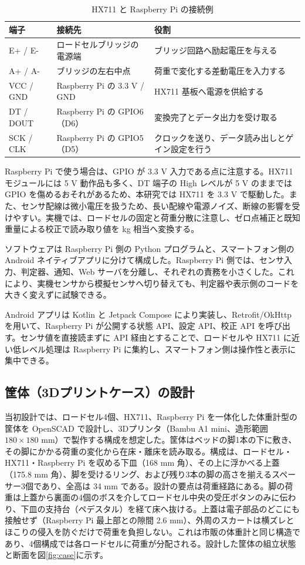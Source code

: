 \documentclass[paper=a4,fontsize=10pt,ja=standard,lualatex]{jlreq}
\begin{document}
\begin{table}[h]
\centering
\caption{HX711 と Raspberry Pi の接続例}
\label{tab:hx711}
\begin{tabularx}{0.95\linewidth}{lYY}
\toprule
端子 & 接続先 & 役割\\
\midrule
E+ / E- & ロードセルブリッジの電源端 & ブリッジ回路へ励起電圧を与える\\
A+ / A- & ブリッジの左右中点 & 荷重で変化する差動電圧を入力する\\
VCC / GND & Raspberry Pi の 3.3 V / GND & HX711 基板へ電源を供給する\\
DT / DOUT & Raspberry Pi の GPIO6（D6） & 変換完了とデータ出力を受け取る\\
SCK / CLK & Raspberry Pi の GPIO5（D5） & クロックを送り、データ読み出しとゲイン設定を行う\\
\bottomrule
\end{tabularx}
\end{table}

Raspberry Pi で使う場合は、GPIO が 3.3 V 入力である点に注意する。HX711 モジュールには 5 V 動作品も多く、DT 端子の High レベルが 5 V のままでは GPIO を傷めるおそれがあるため、本研究では HX711 を 3.3 V で駆動した。また、センサ配線は微小電圧を扱うため、長い配線や電源ノイズ、断線の影響を受けやすい。実機では、ロードセルの固定と荷重分散に注意し、ゼロ点補正と既知重量による校正で読み取り値を kg 相当へ変換する。

ソフトウェアは Raspberry Pi 側の Python プログラムと、スマートフォン側の Android ネイティブアプリに分けて構成した。Raspberry Pi 側では、センサ入力、判定器、通知、Web サーバを分離し、それぞれの責務を小さくした。これにより、実機センサから模擬センサへ切り替えても、判定器や表示側のコードを大きく変えずに試験できる。

Android アプリは Kotlin と Jetpack Compose により実装し、Retrofit/OkHttp を用いて、Raspberry Pi が公開する状態 API、設定 API、校正 API を呼び出す。センサ値を直接読まずに API 経由とすることで、ロードセルや HX711 に近い低レベル処理は Raspberry Pi に集約し、スマートフォン側は操作性と表示に集中できる。

\subsection{筐体（3Dプリントケース）の設計}

当初設計では、ロードセル4個、HX711、Raspberry Pi を一体化した体重計型の筐体を OpenSCAD で設計し、3Dプリンタ（Bambu A1 mini、造形範囲 $180\times180$ mm）で製作する構成を想定した。筐体はベッドの脚1本の下に敷き、その脚にかかる荷重の変化から在床・離床を読み取る。構成は、ロードセル・HX711・Raspberry Pi を収める下皿（168 mm 角）、その上に浮かべる上蓋（175.8 mm 角）、脚を受けるリング、および残り3本の脚の高さを揃えるスペーサー3個であり、全高は 34 mm である。設計の要点は荷重経路にある。脚の荷重は上蓋から裏面の4個のボスを介してロードセル中央の受圧ボタンのみに伝わり、下皿の支持台（ペデスタル）を経て床へ抜ける。上蓋は電子部品のどこにも接触せず（Raspberry Pi 最上部との隙間 2.6 mm）、外周のスカートは横ズレとほこりの侵入を防ぐだけで荷重を負担しない。これは市販の体重計と同じ構造であり、4個構成では各ロードセルに荷重が分配される。設計した筐体の組立状態と断面を図\ref{fig:case}に示す。
\end{document}
